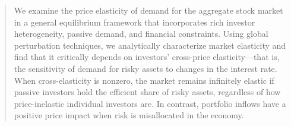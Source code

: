   \sloppy
  \maketitle
  \thispagestyle{empty}
  
  \begin{abstract} 
  \noindent We examine the price elasticity of demand for the aggregate stock market in a general equilibrium framework that incorporates rich investor heterogeneity, passive demand, and financial constraints. Using global perturbation techniques, we analytically characterize market elasticity and find that it critically depends on investors' cross-price elasticity---that is, the sensitivity of demand for risky assets to changes in the interest rate. When cross-elasticity is nonzero, the market remains infinitely elastic if passive investors hold the efficient share of risky assets, regardless of how price-inelastic individual investors are. In contrast, portfolio inflows have a positive price impact when risk is misallocated in the economy.
   
  
  

\end{abstract}
